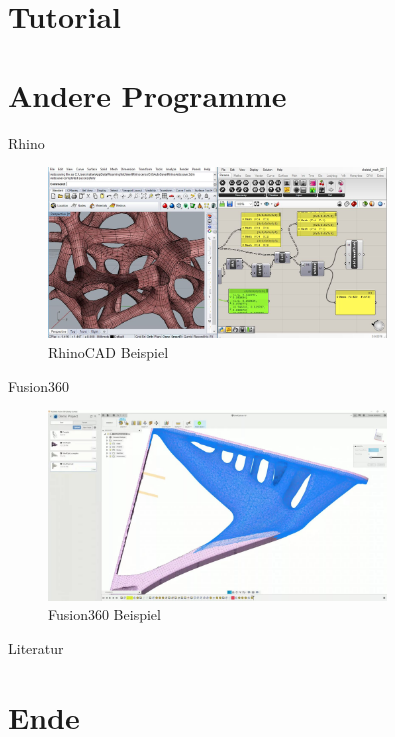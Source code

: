 \documentclass{beamer}
\begin{document}
\section{Tutorial}




\section{Andere Programme}
\begin{frame}{Rhino}
       \begin{figure}[htpb]
        \centering
        \includegraphics[width=0.8\textwidth]{figures/software/rhino.jpg}
        \caption{RhinoCAD Beispiel}
        \label{fig:rhino}
    \end{figure} 
\end{frame}

\begin{frame}{Fusion360}
   
    \begin{figure}[H]
        \centering
        \includegraphics[width=0.8\textwidth]{figures/software/fusion.jpg}
        \caption{Fusion360 Beispiel}
        \label{fig:fusion}
    \end{figure} 
\end{frame}



\begin{frame}[allowframebreaks]{Literatur}
    \section{Ende}
    \printbibliography
\end{frame}
\end{document}
